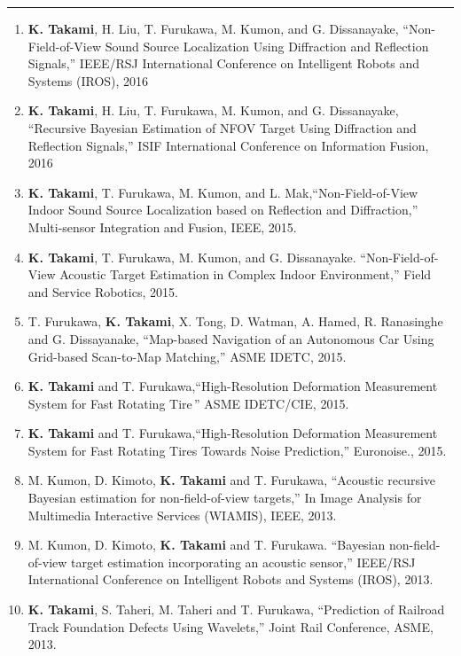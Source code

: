 \documentclass[11pt,letterpaper]{article}
\newcommand{\sect}[1]{\vspace{8mm}{\centering {\bf \large \scshape \uppercase{#1}} \par}  {\color{blue} \vskip 2mm \hrule height 1pt}\vspace{2mm}}
\begin{document}
\sect{Conference papers and workshop}
\begin{enumerate}
	\item {\bf K. Takami}, H. Liu, T. Furukawa, M. Kumon, and G. Dissanayake, ``Non-Field-of-View Sound Source Localization	Using Diffraction and Reflection Signals,'' IEEE/RSJ International Conference on Intelligent Robots and Systems (IROS), 2016
  \item {\bf K. Takami}, H. Liu, T. Furukawa, M. Kumon, and G. Dissanayake, ``Recursive Bayesian Estimation of NFOV Target Using Diffraction and Reflection Signals,'' ISIF International Conference on Information Fusion, 2016
  \item  {\bf K. Takami}, T. Furukawa, M. Kumon, and L. Mak,``Non-Field-of-View Indoor Sound Source Localization based on Reflection and Diffraction,'' Multi-sensor Integration and Fusion, IEEE, 2015.
  \item {\bf K. Takami}, T. Furukawa, M. Kumon, and G. Dissanayake. ``Non-Field-of-View Acoustic Target Estimation in Complex Indoor Environment,'' Field and Service Robotics, 2015.
  \item  T. Furukawa, {\bf K. Takami}, X. Tong, D. Watman, A. Hamed, R. Ranasinghe and G. Dissayanake, ``Map-based Navigation of an Autonomous Car Using Grid-based Scan-to-Map Matching,'' ASME IDETC, 2015.
  \item  {\bf K. Takami} and T. Furukawa,``High-Resolution Deformation Measurement System for Fast Rotating Tire\,'' ASME IDETC/CIE, 2015.


  \item  {\bf K. Takami} and T. Furukawa,``High-Resolution Deformation Measurement System for Fast Rotating Tires Towards Noise Prediction,'' Euronoise., 2015.

  \item M. Kumon, D. Kimoto, {\bf K. Takami} and T. Furukawa, ``Acoustic recursive Bayesian estimation for non-field-of-view targets,'' In Image Analysis for Multimedia Interactive Services (WIAMIS), IEEE, 2013.

  \item M. Kumon, D. Kimoto, {\bf K. Takami} and T. Furukawa. ``Bayesian non-field-of-view target estimation incorporating an acoustic sensor,'' IEEE/RSJ International Conference on Intelligent Robots and Systems  (IROS), 2013.

  \item {\bf K. Takami}, S. Taheri, M. Taheri and T. Furukawa, ``Prediction of Railroad Track Foundation Defects Using Wavelets,'' Joint Rail Conference, ASME, 2013.
\end{enumerate}
\end{document}
